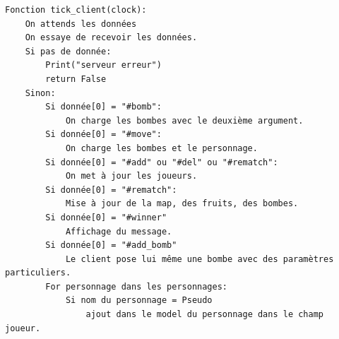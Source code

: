 \documentclass[12pt]{article}
\begin{document}
\begin{verbatim}
Fonction tick_client(clock):
    On attends les données
    On essaye de recevoir les données.
    Si pas de donnée:
        Print("serveur erreur")
        return False
    Sinon:
        Si donnée[0] = "#bomb":
            On charge les bombes avec le deuxième argument.
        Si donnée[0] = "#move":
            On charge les bombes et le personnage.
        Si donnée[0] = "#add" ou "#del" ou "#rematch":
            On met à jour les joueurs.
        Si donnée[0] = "#rematch":
            Mise à jour de la map, des fruits, des bombes.
        Si donnée[0] = "#winner"
            Affichage du message.
        Si donnée[0] = "#add_bomb"
            Le client pose lui même une bombe avec des paramètres particuliers.
        For personnage dans les personnages:
            Si nom du personnage = Pseudo
                ajout dans le model du personnage dans le champ joueur.
    \end{verbatim}
\end{document}
